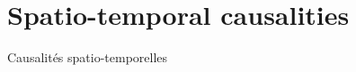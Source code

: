 











\stars






\newpage

\section{Spatio-temporal causalities}{Causalités spatio-temporelles}

\label{app:sec:causalityregimes}









